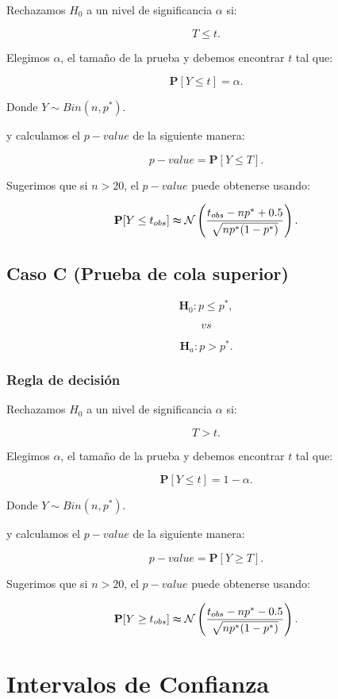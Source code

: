 \documentclass[
  a4paper,
  oneside,
  openany]{book}
\begin{document}
Rechazamos \(H_0\) a un nivel de significancia \(\alpha\) si:

\[T \leq t.\]

Elegimos \(\alpha\), el tamaño de la prueba y debemos encontrar \(t\) tal que:

\[\mathbf{P}[Y \leq t]=\alpha.\]

Donde \(Y \sim Bin (n,p^*)\).

y calculamos el \(p-value\) de la siguiente manera:

\[p-value= \mathbf{P}[Y\leq T].\]

Sugerimos que si \(n > 20\), el \(p-value\) puede obtenerse usando:

\[\mathbf{P}[Y\leq t_{obs}] \thickapprox \mathcal{N} \left(\frac{t_{obs}-np^*+0.5}{\sqrt{np^*(1-p^*)}}\right).\]

\hypertarget{caso-c-prueba-de-cola-superior}{%
\subsection*{Caso C (Prueba de cola superior)}\label{caso-c-prueba-de-cola-superior}}


\[\textbf{H}_{0}: p  \leq p^*,\]

\[vs\]

\[\textbf{H}_{a}: p >p^*.\]

\hypertarget{regla-de-decisiuxf3n-2}{%
\subsubsection*{Regla de decisión}\label{regla-de-decisiuxf3n-2}}


Rechazamos \(H_0\) a un nivel de significancia \(\alpha\) si:

\[T > t.\]

Elegimos \(\alpha\), el tamaño de la prueba y debemos encontrar \(t\) tal que:

\[\mathbf{P}[Y \leq t]=1-\alpha.\]

Donde \(Y \sim Bin (n,p^*)\).

y calculamos el \(p-value\) de la siguiente manera:

\[p-value= \mathbf{P}[Y \geq T].\]

Sugerimos que si \(n > 20\), el \(p-value\) puede obtenerse usando:

\[\mathbf{P}[Y\geq t_{obs}] \thickapprox \mathcal{N} \left(\frac{t_{obs}-np^*-0.5}{\sqrt{np^*(1-p^*)}}\right).\]

\hypertarget{intervalos-de-confianza}{%
\section{Intervalos de Confianza}\label{intervalos-de-confianza}}
\end{document}
